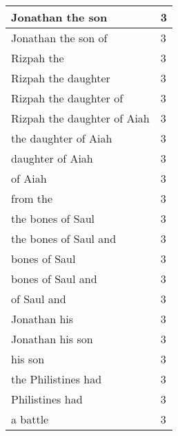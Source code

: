 \begin{center}
\begin{longtable}{|p{3.0in}|p{0.5in}|}
Jonathan the son & 3\\ \hline 
Jonathan the son of & 3\\ \hline 
Rizpah the & 3\\ \hline 
Rizpah the daughter & 3\\ \hline 
Rizpah the daughter of & 3\\ \hline 
Rizpah the daughter of Aiah & 3\\ \hline 
the daughter of Aiah & 3\\ \hline 
daughter of Aiah & 3\\ \hline 
of Aiah & 3\\ \hline 
from the & 3\\ \hline 
the bones of Saul & 3\\ \hline 
the bones of Saul and & 3\\ \hline 
bones of Saul & 3\\ \hline 
bones of Saul and & 3\\ \hline 
of Saul and & 3\\ \hline 
Jonathan his & 3\\ \hline 
Jonathan his son & 3\\ \hline 
his son & 3\\ \hline 
the Philistines had & 3\\ \hline 
Philistines had & 3\\ \hline 
a battle & 3\\ \hline 
\end{longtable}
\end{center}






